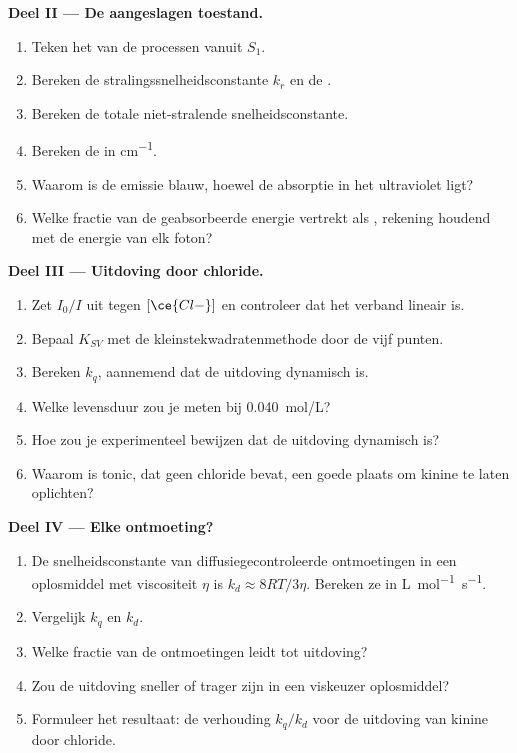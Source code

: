 \begin{problem}
\medskip\noindent\textbf{Deel II --- De aangeslagen toestand.}
\begin{enumerate}[resume]
  \item Teken het  van de processen vanuit $S_1$.
  \item Bereken de stralingssnelheidsconstante $k_r$ en de .
  \item Bereken de totale niet-stralende snelheidsconstante.
  \item Bereken de  in \unit{cm^{-1}}.
  \item Waarom is de emissie blauw, hoewel de absorptie in het ultraviolet ligt?
  \item Welke fractie van de geabsorbeerde energie vertrekt als
        , rekening houdend met de energie van elk foton?
\end{enumerate}

\medskip\noindent\textbf{Deel III --- Uitdoving door chloride.}
\begin{enumerate}[resume]
  \item Zet $I_0/I$ uit tegen $[\ce{Cl-}]$ en controleer dat het verband
        lineair is.
  \item Bepaal $K_{SV}$ met de kleinstekwadratenmethode door de vijf punten.
  \item Bereken $k_q$, aannemend dat de uitdoving dynamisch is.
  \item Welke levensduur zou je meten bij \qty{0.040}{mol/L}?
  \item Hoe zou je experimenteel bewijzen dat de uitdoving dynamisch is?
  \item Waarom is tonic, dat geen chloride bevat, een goede plaats om kinine
        te laten oplichten?
\end{enumerate}

\medskip\noindent\textbf{Deel IV --- Elke ontmoeting?}
\begin{enumerate}[resume]
  \item De snelheidsconstante van diffusiegecontroleerde ontmoetingen in
        een oplosmiddel met viscositeit $\eta$ is $k_d \approx 8RT/3\eta$.
        Bereken ze in \unit{L.mol^{-1}.s^{-1}}.
  \item Vergelijk $k_q$ en $k_d$.
  \item Welke fractie van de ontmoetingen leidt tot uitdoving?
  \item Zou de uitdoving sneller of trager zijn in een viskeuzer oplosmiddel?
  \item Formuleer het resultaat: de verhouding $k_q/k_d$ voor de uitdoving
        van kinine door chloride.
\end{enumerate}
\end{problem}
